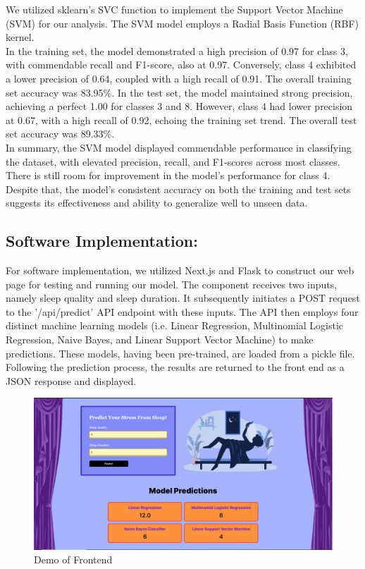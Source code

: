 \documentclass[11pt, letterpaper]{article}
\begin{document}
    \noindent We utilized sklearn's SVC function to implement the Support Vector Machine (SVM) for our analysis. The SVM model employs a Radial Basis Function (RBF) kernel.\\

    \noindent In the training set, the model demonstrated a high precision of 0.97 for class 3, with commendable recall and F1-score, also at 0.97. Conversely, class 4 exhibited a lower precision of 0.64, coupled with a high recall of 0.91. The overall training set accuracy was 83.95\%. In the test set, the model maintained strong precision, achieving a perfect 1.00 for classes 3 and 8. However, class 4 had lower precision at 0.67, with a high recall of 0.92, echoing the training set trend. The overall test set accuracy was 89.33\%.\\
    
    \noindent In summary, the SVM model displayed commendable performance in classifying the dataset, with elevated precision, recall, and F1-scores across most classes. There is still room for improvement in the model's performance for class 4. Despite that, the model's consistent accuracy on both the training and test sets suggests its effectiveness and ability to generalize well to unseen data.

    \noindent\subsection*{Software Implementation:}
    
    \noindent For software implementation, we utilized Next.js and Flask to construct our web page for testing and running our model. The component receives two inputs, namely sleep quality and sleep duration. It subsequently initiates a POST request to the '/api/predict' API endpoint with these inputs. The API then employs four distinct machine learning models (i.e. Linear Regression, Multinomial Logistic Regression, Naive Bayes, and Linear Support Vector Machine) to make predictions. These models, having been pre-trained, are loaded from a pickle file. Following the prediction process, the results are returned to the front end as a JSON response and displayed.

    \begin{figure}[H]
        \centering
        \includegraphics[width=\columnwidth]{frontend.png}
        \caption{Demo of Frontend}
        \label{fig:frontend}
    \end{figure}
\end{document}
